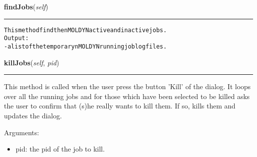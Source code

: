     \label{nMOLDYN:GUI:CheckJobsStatusDialog:CheckJobsStatusDialog:findJobs}

    \vspace{0.5ex}

\hspace{.8\funcindent}\begin{boxedminipage}{\funcwidth}

    \raggedright \textbf{findJobs}(\textit{self})

    \vspace{-1.5ex}

    \rule{\textwidth}{0.5\fboxrule}
\setlength{\parskip}{2ex}
\begin{alltt}

This method find the nMOLDYN active and inactive jobs.
Output:
    -a list of the temporary nMOLDYN running job logfiles. 
\end{alltt}

\setlength{\parskip}{1ex}
    \end{boxedminipage}

    \label{nMOLDYN:GUI:CheckJobsStatusDialog:CheckJobsStatusDialog:killJobs}

    \vspace{0.5ex}

\hspace{.8\funcindent}\begin{boxedminipage}{\funcwidth}

    \raggedright \textbf{killJobs}(\textit{self}, \textit{pid})

    \vspace{-1.5ex}

    \rule{\textwidth}{0.5\fboxrule}
\setlength{\parskip}{2ex}
    This method is called when the user press the button 'Kill' of the 
    dialog. It loops over all the running jobs and for those which have 
    been selected to be killed asks the user to confirm that (s)he really 
    wants to kill them. If so, kills them and updates the dialog.

    Arguments:

    \begin{itemize}
    \setlength{\parskip}{0.6ex}
      \item pid: the pid of the job to kill.

    \end{itemize}

\setlength{\parskip}{1ex}
    \end{boxedminipage}



